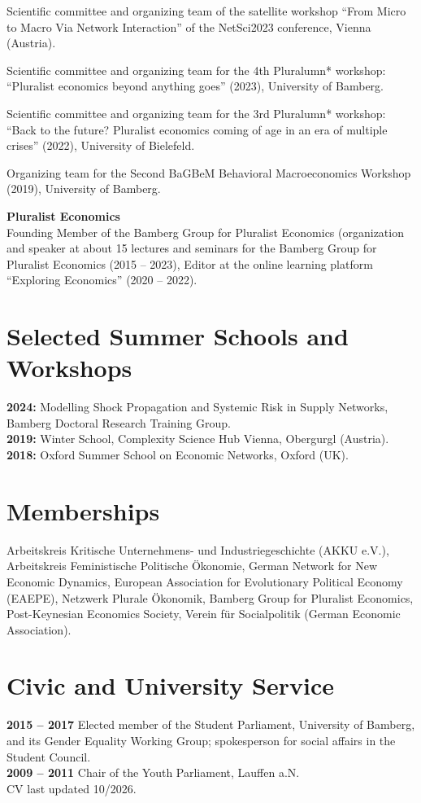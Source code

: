 \documentclass[margin]{res}
\begin{document}
\begin{resume}
	Scientific committee and organizing team of the satellite workshop ``From Micro to Macro Via Network Interaction'' of the NetSci2023 conference, Vienna (Austria).
	
	
	Scientific committee and organizing team for the 4th Pluralumn* workshop: ``Pluralist economics beyond anything goes'' (2023), University of Bamberg. 
	
	
	Scientific committee and organizing team for the 3rd Pluralumn* workshop: ``Back to the future? Pluralist economics coming of age in an era of multiple crises'' (2022), University of Bielefeld. 
	
	Organizing team for the Second BaGBeM Behavioral Macroeconomics Workshop (2019), University of Bamberg.
	
	\textbf{Pluralist Economics}\\
	Founding Member of the Bamberg Group for Pluralist Economics
	(organization and speaker at about 15 lectures and seminars for the Bamberg Group for Pluralist Economics  (2015 -- 2023), Editor at the online learning platform ``Exploring Economics'' (2020 -- 2022).\\
	
	
	\section{Selected Summer Schools and Workshops}
	\textbf{2024:} Modelling Shock Propagation and Systemic Risk in Supply Networks, Bamberg Doctoral Research Training Group.\\
	\textbf{2019:} Winter School, Complexity Science Hub Vienna, Obergurgl (Austria).\\
	\textbf{2018:} Oxford Summer School on Economic Networks, Oxford (UK).\\
	
	\section{Memberships}
	Arbeitskreis Kritische Unternehmens- und Industriegeschichte (AKKU e.V.), Arbeitskreis Feministische Politische \"Okonomie, German Network for New Economic Dynamics, European Association for Evolutionary Political Economy (EAEPE), Netzwerk Plurale \"Okonomik, Bamberg Group for Pluralist Economics, Post-Keynesian Economics Society, Verein f\"ur Socialpolitik (German Economic Association).\\
	
	\section{Civic and University Service}
	\textbf{2015 -- 2017} Elected member of the Student Parliament, University of Bamberg, and its Gender Equality Working Group; spokesperson for social affairs in the Student Council.\\
	\textbf{2009 -- 2011} Chair of the Youth Parliament, Lauffen a.N.\\
	
	\enlargethispage{3\baselineskip}
	\hfill CV last updated 10/2026.
\end{resume}
\end{document}
